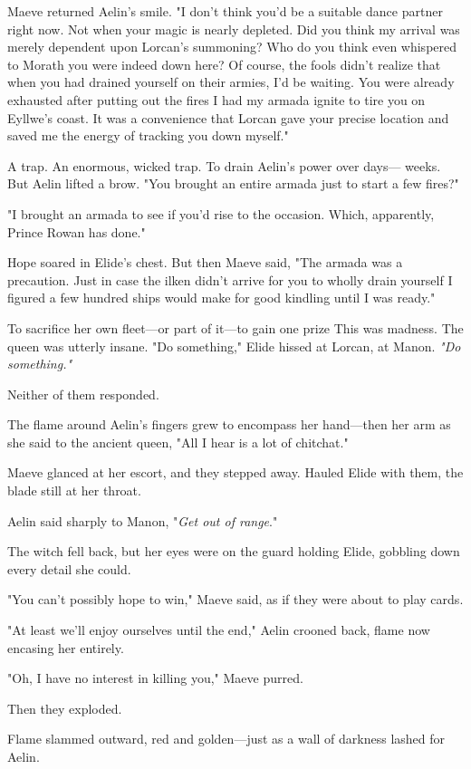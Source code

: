 Maeve returned Aelin's smile. "I don't think you'd be a suitable dance partner right now. Not when your magic is nearly depleted. Did you think my arrival was merely dependent upon Lorcan's summoning? Who do you think even whispered to Morath you were indeed down here? Of course, the fools didn't realize that when you had drained yourself on their armies, I'd be waiting. You were already exhausted after putting out the fires I had my armada ignite to tire you on Eyllwe's coast. It was a convenience that Lorcan gave your precise location and saved me the energy of tracking you down myself."

A trap. An enormous, wicked trap. To drain Aelin's power over days--- weeks. But Aelin lifted a brow. "You brought an entire armada just to start a few fires?"

"I brought an armada to see if you'd rise to the occasion. Which, apparently, Prince Rowan has done."

Hope soared in Elide's chest. But then Maeve said, "The armada was a precaution. Just in case the ilken didn't arrive for you to wholly drain yourself  I figured a few hundred ships would make for good kindling until I was ready."

To sacrifice her own fleet---or part of it---to gain one prize 
This was madness. The queen was utterly insane. "Do something," Elide hissed at Lorcan, at Manon. \emph{"Do something."}

Neither of them responded.

The flame around Aelin's fingers grew to encompass her hand---then her arm as she said to the ancient queen, "All I hear is a lot of chitchat."

Maeve glanced at her escort, and they stepped away. Hauled Elide with them, the blade still at her throat.

Aelin said sharply to Manon, "\emph{Get out of range}."

The witch fell back, but her eyes were on the guard holding Elide, gobbling down every detail she could.

"You can't possibly hope to win," Maeve said, as if they were about to play cards.

"At least we'll enjoy ourselves until the end," Aelin crooned back, flame now encasing her entirely.

"Oh, I have no interest in killing you," Maeve purred.

Then they exploded.

Flame slammed outward, red and golden---just as a wall of darkness lashed for Aelin.

